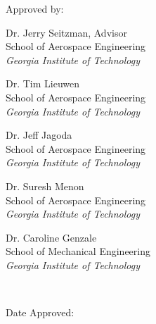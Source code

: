 \thispagestyle{empty}

\begin{center}
  \begin{singlespace}
    \textbf{\thetitle}
  \end{singlespace}
\end{center}

\vfill 

Approved by:

\begin{minipage}[t]{0.4\textwidth}
  \begin{singlespace}
    Dr. Jerry Seitzman, Advisor\\
    School of Aerospace Engineering\\
    \emph{Georgia Institute of Technology}
  \end{singlespace}

  \begin{singlespace}
    Dr. Tim Lieuwen\\
    School of Aerospace Engineering\\
    \emph{Georgia Institute of Technology}
  \end{singlespace}

  \begin{singlespace}
    Dr. Jeff Jagoda\\
    School of Aerospace Engineering\\
    \emph{Georgia Institute of Technology}
  \end{singlespace}
\end{minipage}
\hfill
\begin{minipage}[t]{0.4\textwidth}
  \begin{singlespace}
    Dr. Suresh Menon\\
    School of Aerospace Engineering\\
    \emph{Georgia Institute of Technology}
  \end{singlespace}

  \begin{singlespace}
    Dr. Caroline Genzale\\
    School of Mechanical Engineering\\
    \emph{Georgia Institute of Technology}
  \end{singlespace}
  
  \ \vfill

  Date Approved: 
\end{minipage}
